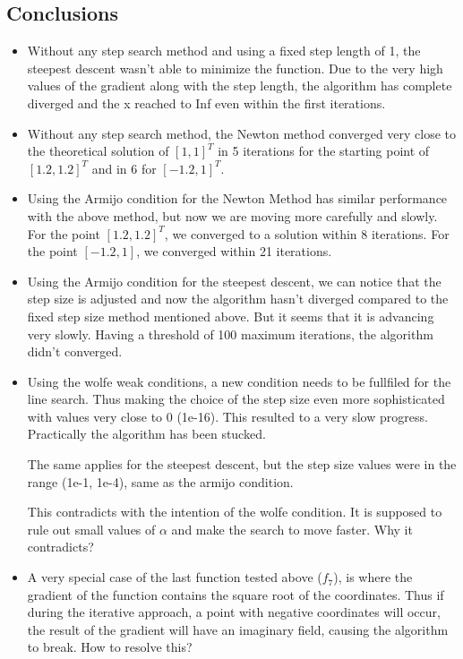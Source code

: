 \documentclass[a4paper,11pt]{article}
\numberwithin{equation}{section} %
\begin{document}
\clearpage


\subsection{Conclusions}

\begin{itemize}
    \item Without any step search method and using a fixed step length of 1, the steepest descent wasn't able to minimize the function. Due to the very high values of the gradient along with the step length, the algorithm has complete diverged and the x reached to Inf even within the first iterations.
    
    \item Without any step search method, the Newton method converged very close to the theoretical solution of $[1,1]^T$ in 5 iterations for the starting point of $[1.2,1.2]^T$ and in 6 for $[-1.2, 1]^T$.
    
    \item Using the Armijo condition for the Newton Method has similar performance with the above method, but now we are moving more carefully and slowly. For the point $[1.2,1.2]^T$, we converged to a solution within 8 iterations. For the point $[-1.2, 1]$, we converged within 21 iterations.
        
    \item Using the Armijo condition for the steepest descent, we can notice that the step size is adjusted and now the algorithm hasn't diverged compared to the fixed step size method mentioned above. But it seems that it is advancing very slowly. Having a threshold of 100 maximum iterations, the algorithm didn't converged.
    
    \item Using the wolfe weak conditions, a new condition needs to be fullfiled for the line search. Thus making the choice of the step size even more sophisticated with values very close to 0 (1e-16). This resulted to a very slow progress. Practically the algorithm has been stucked. 
    
    The same applies for the steepest descent, but the step size values were in the range (1e-1, 1e-4), same as the armijo condition.

    This contradicts with the intention of the wolfe condition. It is supposed to rule out small values of $\alpha$ and make the search to move faster. Why it contradicts?

    \item A very special case of the last function tested above ($f_7$), is where the gradient of the function contains the square root of the coordinates. Thus if during the iterative approach, a point with negative coordinates will occur, the result of the gradient will have an imaginary field, causing the algorithm to break. How to resolve this?
    
\end{itemize} 
\end{document}
